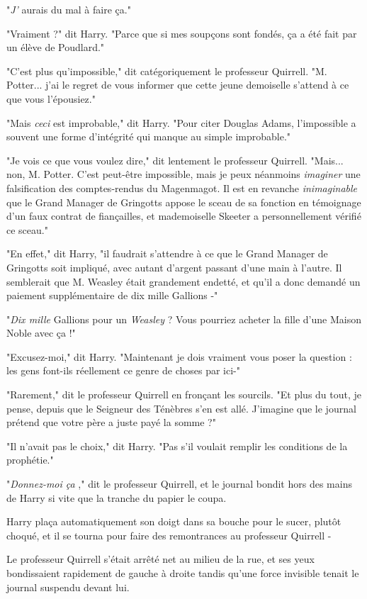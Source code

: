 "\emph{J'} aurais du mal à faire ça."

"Vraiment ?" dit Harry. "Parce que si mes soupçons sont fondés, ça a été fait par un élève de Poudlard."

"C'est plus qu'impossible," dit catégoriquement le professeur Quirrell. "M. Potter... j'ai le regret de vous informer que cette jeune demoiselle s'attend à ce que vous l'épousiez."

"Mais \emph{ceci}  est improbable," dit Harry. "Pour citer Douglas Adams, l'impossible a souvent une forme d'intégrité qui manque au simple improbable."

"Je vois ce que vous voulez dire," dit lentement le professeur Quirrell. "Mais... non, M. Potter. C'est peut-être impossible, mais je peux néanmoins \emph{imaginer}  une falsification des comptes-rendus du Magenmagot. Il est en revanche \emph{inimaginable}  que le Grand Manager de Gringotts appose le sceau de sa fonction en témoignage d'un faux contrat de fiançailles, et mademoiselle Skeeter a personnellement vérifié ce sceau."

"En effet," dit Harry, "il faudrait s'attendre à ce que le Grand Manager de Gringotts soit impliqué, avec autant d'argent passant d'une main à l'autre. Il semblerait que M. Weasley était grandement endetté, et qu'il a donc demandé un paiement supplémentaire de dix mille Gallions -"

"\emph{Dix mille } Gallions pour un \emph{Weasley}  ? Vous pourriez acheter la fille d'une Maison Noble avec ça !"

"Excusez-moi," dit Harry. "Maintenant je dois vraiment vous poser la question : les gens font-ils réellement ce genre de choses par ici-"

"Rarement," dit le professeur Quirrell en fronçant les sourcils. "Et plus du tout, je pense, depuis que le Seigneur des Ténèbres s'en est allé. J'imagine que le journal prétend que votre père a juste payé la somme ?"

"Il n'avait pas le choix," dit Harry. "Pas s'il voulait remplir les conditions de la prophétie."

"\emph{Donnez-moi ça} ," dit le professeur Quirrell, et le journal bondit hors des mains de Harry si vite que la tranche du papier le coupa.

Harry plaça automatiquement son doigt dans sa bouche pour le sucer, plutôt choqué, et il se tourna pour faire des remontrances au professeur Quirrell -

Le professeur Quirrell s'était arrêté net au milieu de la rue, et ses yeux bondissaient rapidement de gauche à droite tandis qu'une force invisible tenait le journal suspendu devant lui.

